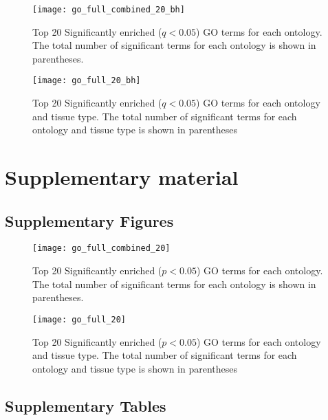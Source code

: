 \documentclass[11pt]{article}
\newcommand{\beginsupplement}{%
        \setcounter{table}{0}
        \renewcommand{\thetable}{S\arabic{table}}
        \setcounter{figure}{0}
        \renewcommand{\thefigure}{S\arabic{figure}}
        \renewcommand{\thesection}{S\arabic{section}}
        \renewcommand{\thesubsection}{S\arabic{subsection}} 
     }
\begin{document}
\clearpage

\singlespacing



\clearpage

\begin{figure}[t]
  \centering
  \texttt{[image: go\_full\_combined\_20\_bh]}
  \caption{Top 20 Significantly enriched ($q < 0.05$) GO terms for
    each ontology. The total number of significant terms for each
    ontology is shown in parentheses.}
  \label{fig:go_full_combined_20_bh}
\end{figure}


\begin{figure}[t]
  \centering
  \texttt{[image: go\_full\_20\_bh]}
  \caption{Top 20 Significantly enriched ($q < 0.05$) GO terms for
    each ontology and tissue type. The total number of significant
    terms for each ontology and tissue type is shown in parentheses}
  \label{fig:go_full_20_bh}
\end{figure}







\clearpage

\beginsupplement

\section*{Supplementary material}

\subsection*{Supplementary Figures}\label{ss:supp-fig}

\begin{figure}[t]
  \centering
  \texttt{[image: go\_full\_combined\_20]}
  \caption{Top 20 Significantly enriched ($p < 0.05$) GO terms for
    each ontology. The total number of significant terms for each
    ontology is shown in parentheses.}
  \label{fig:go_combined}
\end{figure}


\begin{figure}[t]
  \centering
  \texttt{[image: go\_full\_20]}
  \caption{Top 20 Significantly enriched ($p < 0.05$) GO terms for
    each ontology and tissue type. The total number of significant
    terms for each ontology and tissue type is shown in parentheses}
  \label{fig:go_tissue}
\end{figure}
 
\clearpage

\subsection*{Supplementary Tables}\label{ss:supp-tab}
\scriptsize
  
\clearpage

\clearpage

\clearpage
  
\clearpage

\clearpage

\end{document}
